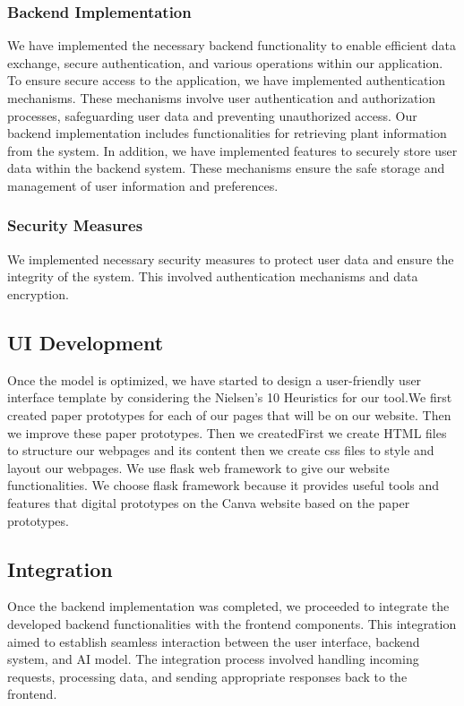 \documentclass[conference]{IEEEtran}
\begin{document}
 \subsubsection{Backend Implementation}
We have implemented the necessary backend functionality to enable efficient data exchange, secure authentication, and various operations within our application.
To ensure secure access to the application, we have implemented authentication mechanisms. These mechanisms involve user authentication and authorization processes, safeguarding user data and preventing unauthorized access.
Our backend implementation includes  functionalities for retrieving plant information from the system.
In addition, we have implemented features to securely store user data within the backend system. These mechanisms ensure the safe storage and management of user information and preferences.

\subsubsection{Security Measures}
We implemented necessary security measures to protect user data and ensure the integrity of the system.
This involved authentication mechanisms and data encryption.

        
\subsection{UI Development} 
 Once the model is optimized, we have started to design a user-friendly user interface template by considering the Nielsen’s 10 Heuristics for our tool.We first created paper prototypes for each of our pages that will be on our website. Then we improve these paper prototypes. Then we createdFirst we create HTML files to structure our webpages and
its content then we create css files to style and layout our
webpages. We use flask web framework to give our website
functionalities. We choose flask framework because it provides
useful tools and features that digital prototypes on the Canva website based on the paper prototypes.

\subsection{Integration}
Once the backend implementation was completed, we proceeded to integrate the developed backend functionalities with the frontend components. This integration aimed to establish seamless interaction between the user interface, backend system, and AI model. The integration process involved handling incoming requests, processing data, and sending appropriate responses back to the frontend.
\end{document}
